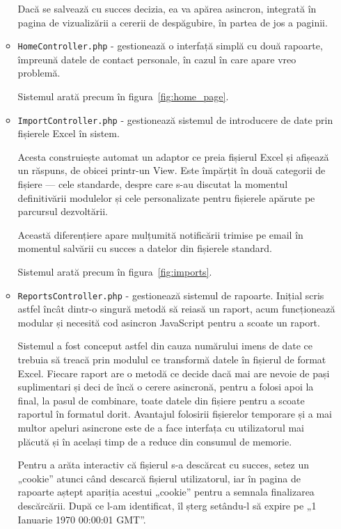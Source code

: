 \begin{itemize}
\begin{itemize}
				Dacă se salvează cu succes decizia, ea va apărea asincron, integrată în pagina de vizualizării a cererii de despăgubire, în partea de jos a paginii.
				\item \verb|HomeController.php| - gestionează o interfață simplă cu două rapoarte, împreună datele de contact personale, în cazul în care apare vreo problemă.

				Sistemul arată precum în figura~\ref{fig:home_page}.

				\item \verb|ImportController.php| - gestionează sistemul de introducere de date prin fișierele Excel în sistem.

				Acesta construiește automat un adaptor ce preia fișierul Excel și afișează un răspuns, de obicei printr-un View.
				Este împărțit în două categorii de fișiere --- cele standarde, despre care s-au discutat la momentul definitivării modulelor și cele personalizate pentru fișierele apărute pe parcursul dezvoltării.

				Această diferențiere apare mulțumită notificării trimise pe email în momentul salvării cu succes a datelor din fișierele standard.

				Sistemul arată precum în figura~\ref{fig:imports}.

				\item \verb|ReportsController.php| - gestionează sistemul de rapoarte.
				Inițial scris astfel încât dintr-o singură metodă să reiasă un raport, acum funcționează modular și necesită cod asincron JavaScript pentru a scoate un raport.

				Sistemul a fost conceput astfel din cauza numărului imens de date ce trebuia să treacă prin modulul ce transformă datele în fișierul de format Excel.
				Fiecare raport are o metodă ce decide dacă mai are nevoie de pași suplimentari și deci de încă o cerere asincronă, pentru a folosi apoi la final, la pasul de combinare, toate datele din fișiere pentru a scoate raportul în formatul dorit.
				Avantajul folosirii fișierelor temporare și a mai multor apeluri asincrone este de a face interfața cu utilizatorul mai plăcută și în același timp de a reduce din consumul de memorie.

				Pentru a arăta interactiv că fișierul s-a descărcat cu succes, setez un „cookie” atunci când descarcă fișierul utilizatorul, iar în pagina de rapoarte aștept apariția acestui „cookie” pentru a semnala finalizarea descărcării.
				După ce l-am identificat, îl șterg setându-l să expire pe „1 Ianuarie 1970 00:00:01 GMT”.


\end{itemize}
\end{itemize}
